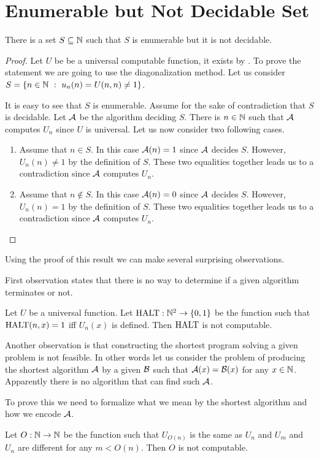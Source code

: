 \section{Enumerable but Not Decidable Set}
\begin{theorem}
  There is a set $S \subseteq {\mathbb{N}}$ such that $S$ is enumerable but it is not
  decidable.
\end{theorem}
\begin{proof}
  Let $U$ be be a universal computable function, it exists by
  .
  To prove the statement we are going to use the diagonalization method.
  Let us consider $S = \set[u_n(n) = U(n, n) \neq 1]{n \in \N}$.

  It is easy to see that $S$ is enumerable. Assume for the sake of
  contradiction that $S$ is decidable. Let $\mathcal{A}$ be the algorithm
  deciding $S$. There is $n \in {\mathbb{N}}$ such that $\mathcal{A}$ computes $U_n$
  since $U$ is universal. Let us now consider two following cases.
  \begin{enumerate}
    \item Assume that $n \in S$. In this case $\mathcal{A}(n) = 1$ since
      $\mathcal{A}$ decides $S$. However, $U_n(n) \neq 1$ by the definition of
      $S$. These two equalities together leads us to a contradiction since
      $\mathcal{A}$ computes $U_n$.
    \item Assume that $n \notin S$. In this case $\mathcal{A}(n) = 0$ since
      $\mathcal{A}$ decides $S$. However, $U_n(n) = 1$ by the definition of
      $S$. These two equalities together leads us to a contradiction since
      $\mathcal{A}$ computes $U_n$.
  \end{enumerate}
\end{proof}

Using the proof of this result we can make several surprising observations.

First observation states that there is no way to determine if a given
algorithm terminates or not.
\begin{theorem}
  Let $U$ be a universal function.
  Let $\Halting : \N^2 \to \set{0, 1}$ be the function such that
  $\mathrm{HALT}(n, x) = 1$ iff $U_n(x)$ is defined. Then $\mathrm{HALT}$ is not
  computable.
\end{theorem}

Another observation is that constructing the shortest program solving a given
problem is not feasible.
In other words let us consider the problem of producing the shortest algorithm
$\mathcal{A}$ by a given $\mathcal{B}$ such that
$\mathcal{A}(x) = \mathcal{B}(x)$ for any $x \in {\mathbb{N}}$. Apparently there is
no algorithm that can find such $\mathcal{A}$.

To prove this we need to formalize what we mean by the shortest algorithm and
how we encode $\mathcal{A}$.
\begin{theorem}
  Let $O : {\mathbb{N}} \to {\mathbb{N}}$ be the function such that
  $U_{O(n)}$ is the same as $U_n$ and $U_m$ and $U_n$ are different
  for any $m < O(n)$. Then $O$ is not computable.
\end{theorem}
